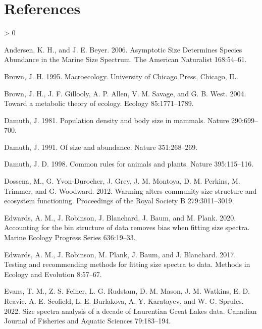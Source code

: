 \documentclass[
]{article}
\newlength{\cslhangindent}
\newenvironment{CSLReferences}[2] %
 {%
  \setlength{\parindent}{0pt}
  \ifodd #1 \everypar{\setlength{\hangindent}{\cslhangindent}}\ignorespaces\fi
  \ifnum #2 > 0
  \setlength{\parskip}{#2\baselineskip}
  \fi
 }%
 {}
\begin{document}
\hypertarget{references}{%
\section{References}\label{references}}

\hypertarget{refs}{}
\begin{CSLReferences}{1}{0}
\leavevmode\hypertarget{ref-Andersen2006a}{}%
Andersen, K. H., and J. E. Beyer. 2006. Asymptotic {Size Determines
Species Abundance} in the {Marine Size Spectrum}. The American
Naturalist 168:54--61.

\leavevmode\hypertarget{ref-brown1995}{}%
Brown, J. H. 1995. Macroecology. {University of Chicago Press},
{Chicago, IL}.

\leavevmode\hypertarget{ref-Brown2004}{}%
Brown, J. H., J. F. Gillooly, A. P. Allen, V. M. Savage, and G. B. West.
2004. Toward a metabolic theory of ecology. Ecology 85:1771--1789.

\leavevmode\hypertarget{ref-Damuth1981}{}%
Damuth, J. 1981. Population density and body size in mammals. Nature
290:699--700.

\leavevmode\hypertarget{ref-Damuth1991}{}%
Damuth, J. 1991. Of size and abundance. Nature 351:268--269.

\leavevmode\hypertarget{ref-Damuth1998}{}%
Damuth, J. D. 1998. Common rules for animals and plants. Nature
395:115--116.

\leavevmode\hypertarget{ref-dossena2012}{}%
Dossena, M., G. Yvon-Durocher, J. Grey, J. M. Montoya, D. M. Perkins, M.
Trimmer, and G. Woodward. 2012. Warming alters community size structure
and ecosystem functioning. Proceedings of the Royal Society B
279:3011--3019.

\leavevmode\hypertarget{ref-edwards2020}{}%
Edwards, A. M., J. Robinson, J. Blanchard, J. Baum, and M. Plank. 2020.
Accounting for the bin structure of data removes bias when fitting size
spectra. Marine Ecology Progress Series 636:19--33.

\leavevmode\hypertarget{ref-edwards2017}{}%
Edwards, A. M., J. Robinson, M. Plank, J. Baum, and J. Blanchard. 2017.
Testing and recommending methods for fitting size spectra to data.
Methods in Ecology and Evolution 8:57--67.

\leavevmode\hypertarget{ref-evans2022}{}%
Evans, T. M., Z. S. Feiner, L. G. Rudstam, D. M. Mason, J. M. Watkins,
E. D. Reavie, A. E. Scofield, L. E. Burlakova, A. Y. Karatayev, and W.
G. Sprules. 2022. Size spectra analysis of a decade of {Laurentian Great
Lakes} data. Canadian Journal of Fisheries and Aquatic Sciences
79:183--194.


\end{CSLReferences}
\end{document}

